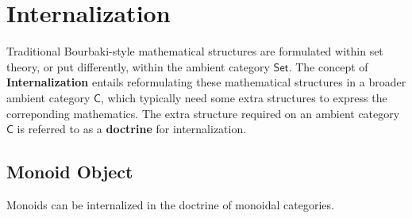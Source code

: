 \section{Internalization}
Traditional Bourbaki-style mathematical structures are formulated within set theory, or put differently, within the ambient category $\mathsf{Set}$. The concept of \textbf{Internalization} entails reformulating these mathematical structures in a broader ambient category $\mathsf{C}$, which typically need some extra structures to express the correponding mathematics. The extra structure required on an ambient category $\mathsf{C}$ is referred to as a \textbf{doctrine} for internalization.

\subsection{Monoid Object}
Monoids can be internalized in the doctrine of monoidal categories.

